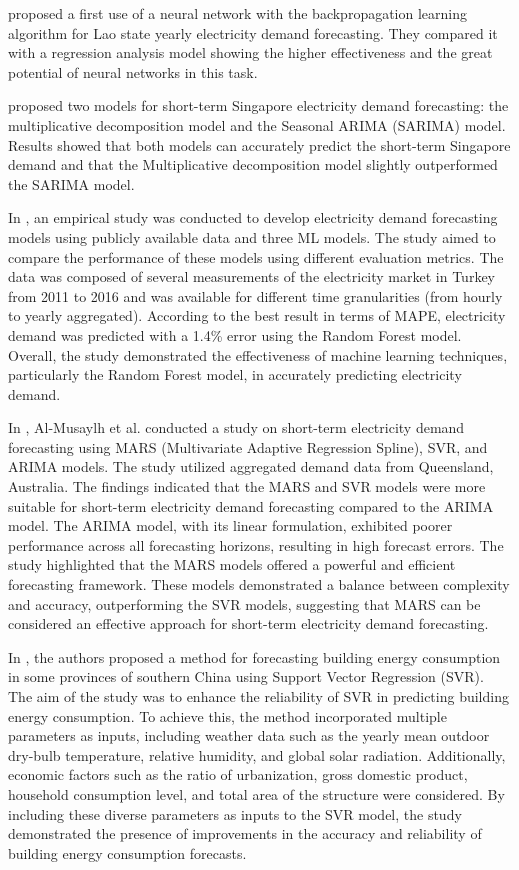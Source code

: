 \cite{5686767} proposed a first use of a neural network with the backpropagation learning algorithm for Lao state yearly electricity demand forecasting.
They compared it with a regression analysis model showing the higher effectiveness and the great potential of neural networks in this task.

\cite{5518553} proposed two models for short-term Singapore electricity demand forecasting: the multiplicative decomposition model and the Seasonal ARIMA (SARIMA) model.
Results showed that both models can accurately predict the short-term Singapore demand and that the Multiplicative decomposition model slightly outperformed the SARIMA model.

In \cite{8093428}, an empirical study was conducted to develop electricity demand forecasting models using publicly available data and three ML models.
The study aimed to compare the performance of these models using different evaluation metrics.
The data was composed of several measurements of the electricity market in Turkey from 2011 to 2016 and was available for different time granularities (from hourly to yearly aggregated).
According to the best result in terms of MAPE, electricity demand was predicted with a 1.4\% error using the Random Forest model.
Overall, the study demonstrated the effectiveness of machine learning techniques, particularly the Random Forest model, in accurately predicting electricity demand.

In \cite{ALMUSAYLH20181}, Al-Musaylh et al. conducted a study on short-term electricity demand forecasting using MARS (Multivariate Adaptive Regression Spline), SVR, and ARIMA models.
The study utilized aggregated demand data from Queensland, Australia.
The findings indicated that the MARS and SVR models were more suitable for short-term electricity demand forecasting compared to the ARIMA model.
The ARIMA model, with its linear formulation, exhibited poorer performance across all forecasting horizons, resulting in high forecast errors.
The study highlighted that the MARS models offered a powerful and efficient forecasting framework.
These models demonstrated a balance between complexity and accuracy, outperforming the SVR models, suggesting that MARS can be considered an effective approach for short-term electricity demand forecasting.

In \cite{MA20193433}, the authors proposed a method for forecasting building energy consumption in some provinces of southern China using Support Vector Regression (SVR).
The aim of the study was to enhance the reliability of SVR in predicting building energy consumption.
To achieve this, the method incorporated multiple parameters as inputs, including weather data such as the yearly mean outdoor dry-bulb temperature, relative humidity, and global solar radiation.
Additionally, economic factors such as the ratio of urbanization, gross domestic product, household consumption level, and total area of the structure were considered.
By including these diverse parameters as inputs to the SVR model, the study demonstrated the presence of improvements in the accuracy and reliability of building energy consumption forecasts.

